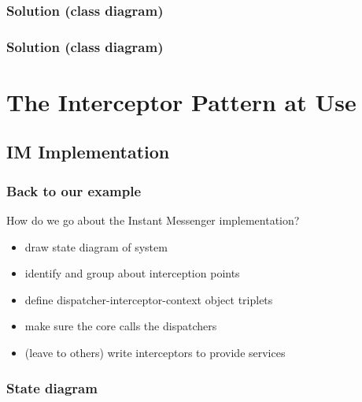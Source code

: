 \documentclass{beamer}
\begin{document}
\begin{frame}
  \frametitle{Solution (class diagram)}

  \begin{center}
  \end{center}

\end{frame}

\begin{frame}
  \frametitle{Solution (class diagram)}

  \begin{center}
  \end{center}

\end{frame}

\section{The Interceptor Pattern at Use}

\subsection{IM Implementation}

\begin{frame}
  \frametitle{Back to our example}

  How do we go about the Instant Messenger implementation?

  \begin{itemize}
  \item draw state diagram of system
  \item identify and group about interception points
  \item define dispatcher-interceptor-context object triplets
  \item make sure the core calls the dispatchers
  \item (leave to others) write interceptors to provide services
  \end{itemize}

\end{frame}

\begin{frame}
  \frametitle{State diagram}

  \begin{center}
  \end{center}

\end{frame}
\end{document}
